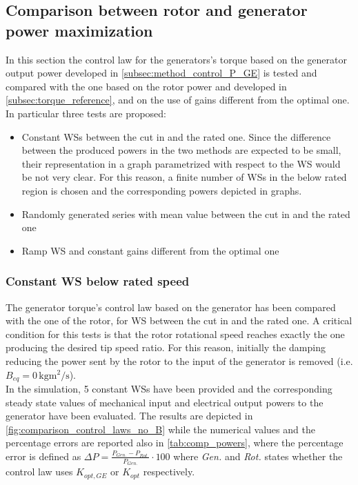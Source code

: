 

\subsection{Comparison between rotor and generator power maximization} \label{subsec:validation_control_P_GE}
In this section the control law for the generators's torque based on the generator output power developed in \autoref{subsec:method_control_P_GE} is tested and compared with the one based on the rotor power and developed in \autoref{subsec:torque_reference}, and on the use of gains different from the optimal one. In particular three tests are proposed:
\begin{itemize}
  \item Constant WSs between the cut in and the rated one. Since the difference between the produced powers in the two methods are expected to be small, their representation in a graph parametrized with respect to the WS would be not very clear. For this reason, a finite number of WSs in the below rated region is chosen and the corresponding powers depicted in graphs.
  \item Randomly generated series with mean value between the cut in and the rated one
  \item Ramp WS and constant gains different from the optimal one 
\end{itemize} 
\subsubsection{Constant WS below rated speed}
The generator torque's control law based on the generator has been compared with the one of the rotor, for WS between the cut in and the rated one. A critical condition for this tests is that the rotor rotational speed reaches exactly the one producing the desired tip speed ratio. For this reason, initially the damping reducing the power sent by the rotor to the input of the generator is removed (i.e. $B_{eq}=0 \, \si{\kilo\gram\square\meter\per\second}$). \\
In the simulation, 5 constant WSs have been provided and the corresponding steady state values of mechanical input and electrical output powers to the generator have been evaluated. The results are depicted in \autoref{fig:comparison_control_laws_no_B} while the numerical values and the percentage errors are reported also in \autoref{tab:comp_powers}, where the percentage error is defined as $\Delta P = \frac{P_{Gen.} - P_{Rot.}}{P_{Gen.}}\cdot 100$ where  \textit{Gen.} and \textit{Rot.} states whether the control law uses $K_{opt,GE}$ or $K_{opt}$ respectively.

